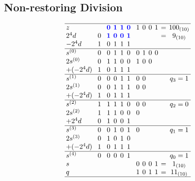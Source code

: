 \documentclass[a4paper,6pt]{article}
\begin{document}
\begin{multicols*}{3}
\subsection*{Non-restoring Division}

\[
\setlength\arraycolsep{2pt} %
\begin{array}{lcccccccccccccc}
\hline
z                   & &   & & \textcolor{blue}{\textbf{0}} & \textcolor{blue}{\textbf{1}} & \textcolor{blue}{\textbf{1}} & \textcolor{blue}{\textbf{0}} & & 1 & 0 & 0 & 1 & = & 100_{(10)} \\
2^4 d               & & 0 & & \textcolor{blue}{\textbf{1}} & \textcolor{blue}{\textbf{0}} & \textcolor{blue}{\textbf{0}} & \textcolor{blue}{\textbf{1}} & &   &   &   &   & = & 9_{(10)} \\
-2^4 d              & & 1 & & 0 & 1 & 1 & 1 & &   &   &   &   &   &   \\
\hline
s^{(0)}             & & 0 & & 0 & 1 & 1 & 0 & & 0 & 1 & 0 & 0 &   &   \\
2s^{(0)}            & & 0 & & 1 & 1 & 0 & 0 & & 1 & 0 & 0 &   &   &   \\
+(-2^4d)            & & 1 & & 0 & 1 & 1 & 1 & &   &   &   &   &   &   \\
\hline
s^{(1)}             & & 0 & & 0 & 0 & 1 & 1 & & 0 & 0 &   &   &   & q_3 = 1 \\
2s^{(1)}            & & 0 & & 0 & 1 & 1 & 1 & & 0 & 0 &   &   &   &   \\
+(-2^4d)            & & 1 & & 0 & 1 & 1 & 1 & &   &   &   &   &   &   \\
\hline
s^{(2)}             & & 1 & & 1 & 1 & 1 & 0 & & 0 & 0 &   &   &   & q_2 = 0 \\
2s^{(2)}            & & 1 & & 1 & 1 & 0 & 0 & & 0 &   &   &   &   &   \\
+2^4d               & & 0 & & 1 & 0 & 0 & 1 & &   &   &   &   &   &   \\
\hline
s^{(3)}             & & 0 & & 0 & 1 & 0 & 1 & & 0 &   &   &   &   & q_1 = 1 \\
2s^{(3)}            & & 0 & & 1 & 0 & 1 & 0 & &   &   &   &   &   &   \\
+(-2^4d)            & & 1 & & 0 & 1 & 1 & 1 & &   &   &   &   &   &   \\
\hline
s^{(4)}             & & 0 & & 0 & 0 & 0 & 1 & &   &   &   &   &   & q_0 = 1 \\
s                   & &   & &   &   &   &   & & 0 & 0 & 0 & 1 & = & 1_{(10)}   \\
q                   & &   & &   &   &   &   & & 1 & 0 & 1 & 1 & = & 11_{(10)}  \\
\hline
\end{array}
\]



\end{multicols*}
\end{document}

